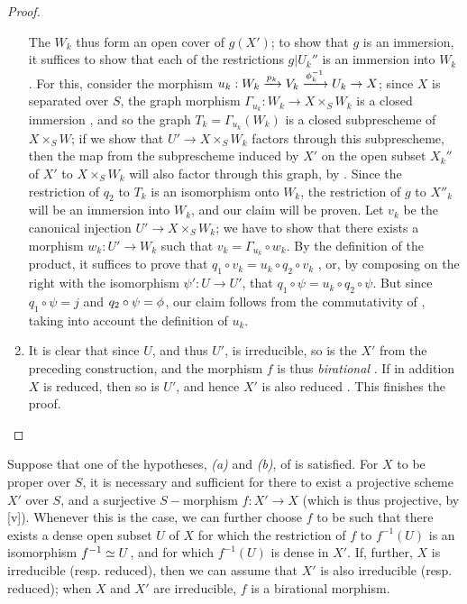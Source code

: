 \begin{proof}
\begin{enumerate}[label=(\Alph*)]
    The $W_k$ thus form an open cover of $g(X')$; to show that $g$ is an immersion, it suffices to show that each of the restrictions $g|U_k''$ is an immersion into $W_k$ .
    For this, consider the morphism $u_k:W_k\xrightarrow{p_k}V_k\xrightarrow{\vphi_k^{-1}}U_k\to X$; since $X$ is separated over $S$, the graph morphism $\Gamma_{u_k}:W_k\to X\times_S W_k$ is a closed immersion , and so the graph $T_k=\Gamma_{u_k}(W_k)$ is a closed subprescheme of $X\times_S W$;
    if we show that $U'\to X\times_S W_k$ factors through this subprescheme, then the map from the subprescheme induced by $X'$ on the open subset $X_k''$ of $X'$ to $X\times_S W_k$ will also factor through this graph, by .
    Since the restriction of $q_2$ to $T_k$ is an isomorphism onto $W_k$, the restriction of $g$ to $X''_k$ will be an immersion into $W_k$, and our claim will be proven.
    Let $v_k$ be the canonical injection $U'\to X\times_S W_k$; we have to show that there exists a morphism $w_k:U'\to W_k$ such that $v_k=\Gamma_{u_k}\circ w_k$.
    By the definition of the product, it suffices to prove that $q_1\circ v_k=u_k\circ q_2\circ v_k$ , or, by composing on the right
    with the isomorphism $\psi':U\to U'$, that $q_1\circ\psi=u_k\circ q_2\circ\psi$.
    But since $q_1\circ\psi=j$ and $q_2\circ\psi=\phi$, our claim follows from the commutativity of , taking into account the definition of $u_k$.
  \item It is clear that since $U$, and thus $U'$, is irreducible, so is the $X'$ from the preceding construction, and the morphism $f$ is thus \emph{birational} .
    If in addition $X$ is reduced, then so is $U'$, and hence $X'$ is also reduced .
    This finishes the proof.
\end{enumerate}
\end{proof}

\begin{cor}[5.6.2]
\label{2.5.6.2}
Suppose that one of the hypotheses, \emph{(a)} and \emph{(b)}, of  is satisfied.
For $X$ to be proper over $S$, it is necessary and sufficient for there to exist a projective scheme $X'$ over $S$, and a surjective $S-$morphism $f:X'\to X$ (which is thus projective, by [v]).
Whenever this is the case, we can further choose $f$ to be such that there exists a dense open subset $U$ of $X$ for which the restriction of $f$ to $f^{-1}(U)$ is an isomorphism $f^{-1}\simeq U$, and for which $f^{-1}(U)$ is dense in $X'$.
If, further, $X$ is irreducible (resp. reduced), then we can assume that $X'$ is also irreducible (resp. reduced); when $X$ and $X'$ are irreducible, $f$ is a birational morphism.
\end{cor}

